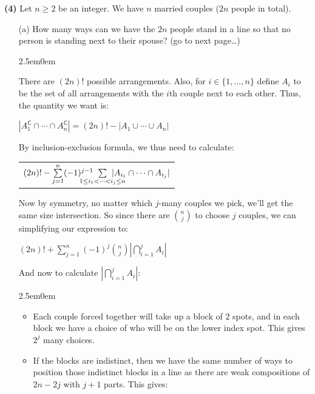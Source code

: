 \documentclass{book}
\newcommand{\exOne}{%
   \color{Purple}%
   \fontsize{13}{15}\selectfont%
}
\newcommand{\exTwoP}{%
   \color{RedViolet}%
   \fontsize{13}{15}\selectfont%
}
\newenvironment{myIndent}{%
   \begin{adjustwidth}{2.5em}{0em}%
}{%
   \end{adjustwidth}%
}
\newcommand{\blab}[1]{\textbf{#1}}
\newcommand{\comp}{\mathsf{C}}
\newcommand{\retTwo}{\hfill\bigbreak}
\begin{document}
\blab{(4)} Let $n \geq 2$ be an integer. We have $n$ married couples ($2n$ people in total).
\begin{enumerate}
	\item[(a)] How many ways can we have the $2n$ people stand in a line so that no person is standing next to their spouse? (go to next page\dots)
	
	\begin{myIndent}\exOne
		There are $(2n)!$ possible arrangements. Also, for $i \in \{1, \ldots, n\}$ define $A_i$ to be the set of all arrangements with the $i$th couple next to each other. Thus, the quantity we want is:

		{\centering $|A_1^{\comp} \cap \cdots \cap A_n^\comp| = (2n)! - |A_1 \cup \cdots \cup A_n|$ \retTwo\par}

		By inclusion-exclusion formula, we thus need to calculate:

		{\centering 
		\begin{tabular}{l}
			$(2n)! - \sum\limits_{j=1}^n(-1)^{j-1}\hspace{-1.8em}\sum\limits_{1 \leq i_1 < \cdots < i_j \leq n}\hspace{-1.8em}|A_{i_1} \cap \cdots \cap A_{i_j}|$
		\end{tabular}\retTwo\par}

		Now by symmetry, no matter which $j$-many couples we pick, we'll get the same size intersection. So since there are $\binom{n}{j}$ to choose $j$ couples, we can simplifying our expression to:\\ [-24pt]

		{\centering $(2n)! + \sum\limits_{j=1}^n (-1)^j \binom{n}{j}|\bigcap\limits_{i=1}^j A_i|$ \retTwo\par}

		And now to calculate $|\bigcap\limits_{i=1}^j A_i|$:
		
		\begin{myIndent}\exTwoP
			\begin{itemize}
				\item Each couple forced together will take up a block of $2$ spots, and in each block we have a choice of who will be on the lower index spot. This gives $2^j$ many choices.
				\item If the blocks are indistinct, then we have the same number of ways to position those indistinct blocks in a line as there are weak compositions of $2n-2j$ with $j + 1$ parts. This gives:
				

\end{itemize}
\end{myIndent}
\end{myIndent}
\end{enumerate}
\end{document}
